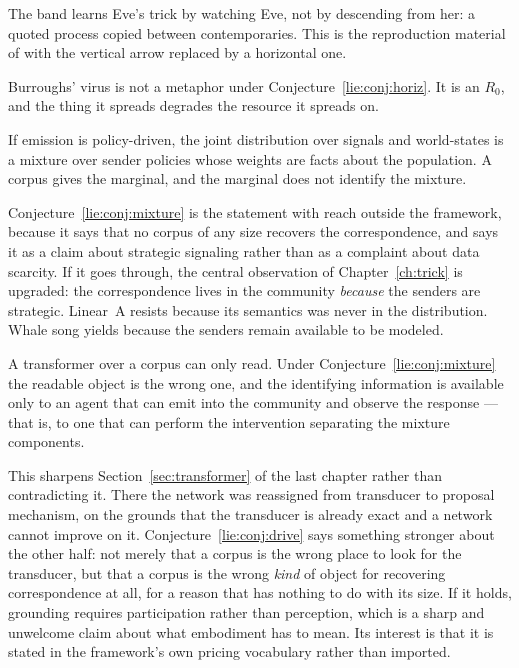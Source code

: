 \begin{conjecture}
\label{lie:conj:horiz}
The band learns Eve's trick by watching Eve, not by descending from her: a quoted
process copied between contemporaries. This is the reproduction material of
\chSci with the vertical arrow replaced by a horizontal one.
\end{conjecture}

Burroughs' virus is not a metaphor under Conjecture~\ref{lie:conj:horiz}. It is
an $R_{0}$, and the thing it spreads degrades the resource it spreads on.

\begin{conjecture}
\label{lie:conj:mixture}
If emission is policy-driven, the joint distribution over signals and
world-states is a mixture over sender policies whose weights are facts about the
population. A corpus gives the marginal, and the marginal does not identify the
mixture.
\end{conjecture}

Conjecture~\ref{lie:conj:mixture} is the statement with reach outside the
framework, because it says that no corpus of any size recovers the
correspondence, and says it as a claim about strategic signaling rather than as a
complaint about data scarcity. If it goes through, the central observation of
Chapter~\ref{ch:trick} is upgraded: the correspondence lives in the community
\emph{because} the senders are strategic. Linear~A resists because its semantics
was never in the distribution. Whale song yields because the senders remain
available to be modeled.

\begin{conjecture}
\label{lie:conj:drive}
A transformer over a corpus can only read. Under
Conjecture~\ref{lie:conj:mixture} the readable object is the wrong one, and the
identifying information is available only to an agent that can emit into the
community and observe the response --- that is, to one that can perform the
intervention separating the mixture components.
\end{conjecture}

This sharpens Section~\ref{sec:transformer} of the last chapter rather than
contradicting it. There the network was reassigned from transducer to proposal
mechanism, on the grounds that the transducer is already exact and a network
cannot improve on it. Conjecture~\ref{lie:conj:drive} says something stronger
about the other half: not merely that a corpus is the wrong place to look for the
transducer, but that a corpus is the wrong \emph{kind} of object for recovering
correspondence at all, for a reason that has nothing to do with its size. If it
holds, grounding requires participation rather than perception, which is a sharp
and unwelcome claim about what embodiment has to mean. Its interest is that it is
stated in the framework's own pricing vocabulary rather than imported.


